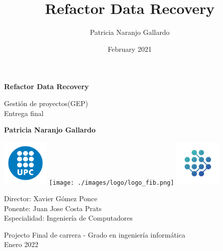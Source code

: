 \documentclass[12pt]{article}
\title{Refactor Data Recovery}
\author{Patricia Naranjo Gallardo}
\date{February 2021}
\begin{document}
    \begin{titlepage}
    \vspace*{\fill}
    \begin{center}

    \LARGE
    \textbf{Refactor Data Recovery}

    \vspace{0.5cm}
    \Large
    Gestión de proyectos(GEP) \\
    Entrega final
    
    \vspace{0.5cm}
    
    \vspace*{\fill}
    
    \Large
    \textbf{Patricia Naranjo Gallardo}
    
    \vspace*{\fill}
    
    
    \end{center}
    
    \vspace*{\fill}
    \vfill
    \begin{center}

    \includegraphics[width=0.17\textwidth]{./images/logo/logo_upc.png}
    \texttt{[image: ./images/logo/logo\_fib.png]}
    \includegraphics[width=0.17\textwidth]{./images/logo/logo_reach.png}

    \vspace{1cm}
    
    Director: Xavier Gómez Ponce\\
    Ponente: Juan Jose Costa Prats\\
    Especialidad: Ingeniería de Computadores\\
   
    \vspace{1cm}
    
    Projecto Final de carrera -  Grado en ingeniería informática \\ 
    Enero 2022
    
    \end{center}
    \end{titlepage}
    
\end{document}
